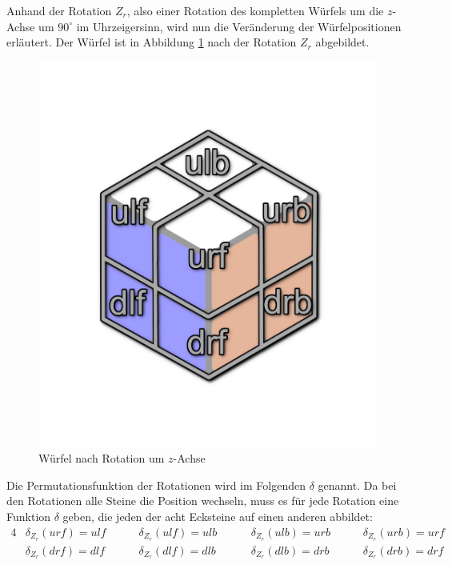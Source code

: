 \documentclass[12pt,a4paper, usenames, dvipsnames]{article}
\theoremstyle{mystyle}
\theoremstyle{definition}
\begin{document}
Anhand der Rotation $Z_r$, also einer Rotation des kompletten Würfels um die $z$-Achse um $90^\circ$ im Uhrzeigersinn, wird nun die Veränderung der Würfelpositionen erläutert. Der Würfel ist in Abbildung \ref{Abbildung_WürfelNachRotationUmZAchse} nach der Rotation $Z_r$ abgebildet.
\begin{figure}[H]
\centering
\includegraphics[scale=0.13]{auf_ulf.png}
\caption{Würfel nach Rotation um $z$-Achse}
\label{Abbildung_WürfelNachRotationUmZAchse}
\end{figure}
Die Permutationsfunktion der Rotationen wird im Folgenden $\delta$ genannt. Da bei den Rotationen alle Steine die Position wechseln, muss es für jede Rotation eine Funktion $\delta$ geben, die jeden der acht Ecksteine auf einen anderen abbildet:
\begin{alignat*}{4}
& \delta_{Z_r}(\textit{urf}) = \textit{ulf} \ \ \ \ \ \ && \delta_{Z_r}(\textit{ulf}) = \textit{ulb} \ \ \ \ \ \ && \delta_{Z_r}(\textit{ulb}) = \textit{urb} \ \ \ \ \ \ && \delta_{Z_r}(\textit{urb}) = \textit{urf} \\
& \delta_{Z_r}(\textit{drf}) = \textit{dlf} \ \ \ \ \ \ && \delta_{Z_r}(\textit{dlf}) = \textit{dlb} \ \ \ \ \ \ \ && \delta_{Z_r}(\textit{dlb}) = \textit{drb} \ \ \ \ \ \ && \delta_{Z_r}(\textit{drb}) = \textit{drf}
\end{alignat*}
\end{document}
